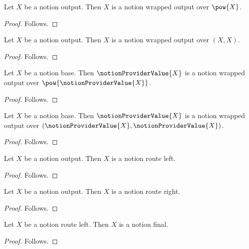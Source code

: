 \begin{classification}\label{notion_provider_output_is_wrapped_output}
    Let $X$ be a notion output.
    Then $X$ is a notion wrapped output over $\pow{X}$.
\end{classification}
\begin{proof}
    Follows.
\end{proof}

\begin{classification}\label{notion_provider_output_is_pair_wrapped_output}
    Let $X$ be a notion output.
    Then $X$ is a notion wrapped output over $(X,X)$.
\end{classification}
\begin{proof}
    Follows.
\end{proof}

\begin{proposition}\label{notion_provider_result_rich_unary_conclusion}
    Let $X$ be a notion base.
    Then $\notionProviderValue{X}$ is a notion wrapped output over
        $\pow{\notionProviderValue{X}}$.
\end{proposition}
\begin{proof}
    Follows.
\end{proof}

\begin{proposition}\label{notion_provider_result_pair_unary_conclusion}
    Let $X$ be a notion base.
    Then $\notionProviderValue{X}$ is a notion wrapped output over
        $(\notionProviderValue{X},\notionProviderValue{X})$.
\end{proposition}
\begin{proof}
    Follows.
\end{proof}

\begin{classification}\label{notion_provider_output_is_route_left}
    Let $X$ be a notion output.
    Then $X$ is a notion route left.
\end{classification}
\begin{proof}
    Follows.
\end{proof}

\begin{classification}\label{notion_provider_output_is_route_right}
    Let $X$ be a notion output.
    Then $X$ is a notion route right.
\end{classification}
\begin{proof}
    Follows.
\end{proof}

\begin{classification}\label{notion_provider_route_left_is_final}
    Let $X$ be a notion route left.
    Then $X$ is a notion final.
\end{classification}
\begin{proof}
    Follows.
\end{proof}

